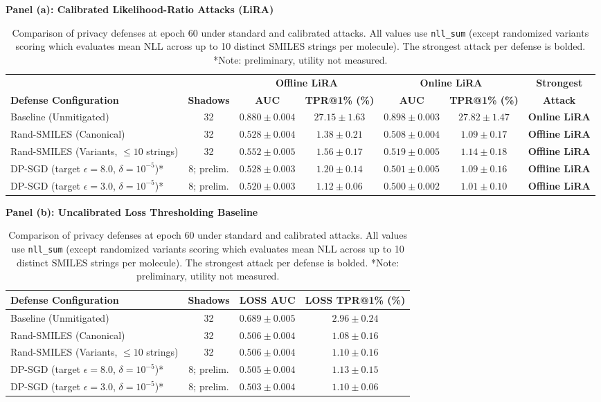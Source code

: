 \begin{table}[t]
\centering
\caption{Comparison of privacy defenses at epoch 60 under standard and calibrated attacks. All values use \texttt{nll\_sum} (except randomized variants scoring which evaluates mean NLL across up to 10 distinct SMILES strings per molecule). The strongest attack per defense is bolded. *Note: preliminary, utility not measured.}
\label{tab:defenses}
\small
\setlength{\tabcolsep}{3.5pt}
\textbf{Panel (a): Calibrated Likelihood-Ratio Attacks (LiRA)} \\[0.5ex]
\begin{tabular}{lcccccc}
\toprule
& & \multicolumn{2}{c}{\textbf{Offline LiRA}} & \multicolumn{2}{c}{\textbf{Online LiRA}} & \textbf{Strongest} \\
\cmidrule(lr){3-4} \cmidrule(lr){5-6} \cmidrule(lr){7-7}
\textbf{Defense Configuration} & \textbf{Shadows} & \textbf{AUC} & \textbf{TPR@1\% (\%)} & \textbf{AUC} & \textbf{TPR@1\% (\%)} & \textbf{Attack} \\
\midrule
Baseline (Unmitigated) & 32 & $0.880 \pm 0.004$ & $27.15 \pm 1.63$ & $0.898 \pm 0.003$ & $27.82 \pm 1.47$ & \textbf{Online LiRA} \\
Rand-SMILES (Canonical) & 32 & $0.528 \pm 0.004$ & $1.38 \pm 0.21$ & $0.508 \pm 0.004$ & $1.09 \pm 0.17$ & \textbf{Offline LiRA} \\
Rand-SMILES (Variants, $\le 10$ strings) & 32 & $0.552 \pm 0.005$ & $1.56 \pm 0.17$ & $0.519 \pm 0.005$ & $1.14 \pm 0.18$ & \textbf{Offline LiRA} \\
DP-SGD (target $\epsilon=8.0$, $\delta=10^{-5}$)* & 8; prelim. & $0.528 \pm 0.003$ & $1.20 \pm 0.14$ & $0.501 \pm 0.005$ & $1.09 \pm 0.16$ & \textbf{Offline LiRA} \\
DP-SGD (target $\epsilon=3.0$, $\delta=10^{-5}$)* & 8; prelim. & $0.520 \pm 0.003$ & $1.12 \pm 0.06$ & $0.500 \pm 0.002$ & $1.01 \pm 0.10$ & \textbf{Offline LiRA} \\
\bottomrule
\end{tabular}

\vspace{1.5ex}

\textbf{Panel (b): Uncalibrated Loss Thresholding Baseline} \\[0.5ex]
\begin{tabular}{lccc}
\toprule
\textbf{Defense Configuration} & \textbf{Shadows} & \textbf{LOSS AUC} & \textbf{LOSS TPR@1\% (\%)} \\
\midrule
Baseline (Unmitigated) & 32 & $0.689 \pm 0.005$ & $2.96 \pm 0.24$ \\
Rand-SMILES (Canonical) & 32 & $0.506 \pm 0.004$ & $1.08 \pm 0.16$ \\
Rand-SMILES (Variants, $\le 10$ strings) & 32 & $0.506 \pm 0.004$ & $1.10 \pm 0.16$ \\
DP-SGD (target $\epsilon=8.0$, $\delta=10^{-5}$)* & 8; prelim. & $0.505 \pm 0.004$ & $1.13 \pm 0.15$ \\
DP-SGD (target $\epsilon=3.0$, $\delta=10^{-5}$)* & 8; prelim. & $0.503 \pm 0.004$ & $1.10 \pm 0.06$ \\
\bottomrule
\end{tabular}
\end{table}
